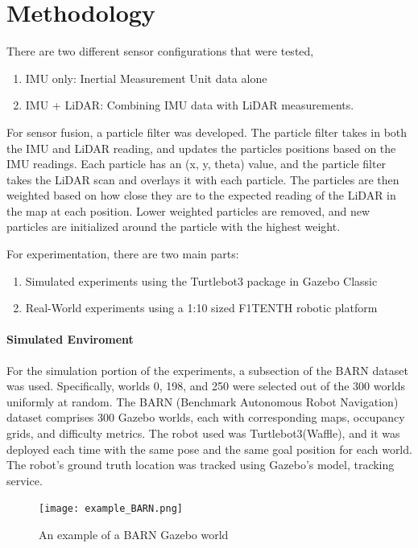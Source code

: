 \documentclass[10.5pt]{article}
\begin{document}
\section{Methodology}
There are two different sensor configurations that were tested, 
\begin{enumerate}
    \item IMU only: Inertial  Measurement Unit data alone
    \item IMU + LiDAR: Combining IMU data with LiDAR measurements.
\end{enumerate}
For sensor fusion, a particle filter\cite{kunsch2013particle} was developed. The particle filter takes in both the IMU and LiDAR reading, and updates the particles positions based on the IMU readings. Each particle has an (x, y, theta) value, and the particle filter takes the LiDAR scan and overlays it with each particle. The particles are then weighted based on how close they are to the expected reading of the LiDAR in the map at each position. Lower weighted particles are removed, and new particles are initialized around the particle with the highest weight.

For experimentation, there are two main parts:
\begin{enumerate}
    \item Simulated experiments using the Turtlebot3 package in Gazebo Classic
    \item Real-World experiments using a 1:10 sized F1TENTH robotic platform\cite{f1tenth}
\end{enumerate}

\paragraph{Simulated Enviroment}
For the simulation portion of the experiments, a subsection of the BARN dataset\cite{perille2020benchmarking} was used. Specifically, worlds 0, 198, and 250 were selected out of the 300 worlds uniformly at random. The BARN (Benchmark Autonomous Robot Navigation) dataset comprises 300 Gazebo worlds, each with corresponding maps, occupancy grids, and difficulty metrics. The robot used was Turtlebot3(Waffle), and it was deployed each time with the same pose and the same goal position for each world. The robot's ground truth location was tracked using Gazebo's model, tracking service.
\begin{figure}[h]
    \centering
    \texttt{[image: example\_BARN.png]}
    \caption{An example of a BARN Gazebo world}
    \label{fig:ex_barn_world}
\end{figure}
\end{document}
